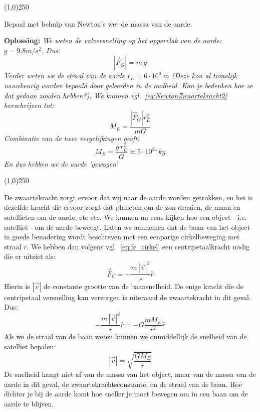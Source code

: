 \begin{center}
\line(1,0){250}
\end{center}
\begin{voorbeeld} 
Bepaal met behulp van Newton's wet de massa van de aarde.

{\bf Oplossing: }{\it We weten de valversnelling op het oppervlak van de aarde: $g=9.8m/s^2$. Dus:
\begin{equation}
|\vec{F}_G| = m\,g
\end{equation}
Verder weten we 
de straal van de aarde $r_E=6\cdot 10^6~m$ (Deze kon al tamelijk nauwkeurig worden bepaald door geleerden
in de oudheid. Kan je bedenken hoe ze dat gedaan zouden hebben?). We kunnen vgl.~\ref{eq:NewtonZwaartekracht2} herschrijven tot:
\begin{equation}
M_E = \frac{|\vec{F}_G| r_E^2}{m G}
\end{equation}
Combinatie van de twee vergelijkingen geeft:
\begin{equation}
M_E  =\frac{g \, r_E^2}{G} \approx 5\cdot 10^{24}\,kg
\end{equation}
En dus hebben we de aarde 'gewogen'.
}
\end{voorbeeld}
\begin{center}
\line(1,0){250}
\end{center}

De zwaartekracht zorgt ervoor dat wij naar de aarde worden getrokken, en het is dezelfde kracht die ervoor
zorgt dat planeten om de zon draaien, de maan en satellieten om de aarde, etc etc. We kunnen nu eens kijken 
hoe een object - i.e. satelliet - om de aarde beweegt. Laten we aannemen dat de baan van het object in goede
benadering wordt beschreven met een eenparige cirkelbeweging met straal $r$. We hebben dan volgens 
vgl.~\ref{eq:fc_cirkel} een centripetaalkracht nodig die er uitziet als:
\begin{equation}
\vec{F}_C = -\frac{m\,|\vec{v}|^2}{r}\hat{r}
\end{equation}
Hierin is $|\vec{v}|$ de constante grootte van de baansnelheid.  De enige kracht die de centripetaal versnelling kan
verzorgen is uiteraard de zwaartekracht in dit geval. Dus:
\begin{equation}
-\frac{m\,|\vec{v}|^2}{r}\hat{r} =  - G\frac{m M_E}{r^2}\hat{r}
\end{equation}
Als we de straal van de baan weten kunnen we onmiddellijk de snelheid van de satelliet bepalen:
\begin{equation}
|\vec{v}| = \sqrt{\frac{G M_E}{r}}
\end{equation}
De snelheid hangt niet af van de massa van het object, maar van de massa van de aarde in dit geval, de
zwaartekrachtsconstante, en de straal van de baan. Hoe dichter je bij de aarde komt hoe sneller je 
moet bewegen om in een baan om de aarde te blijven. 

